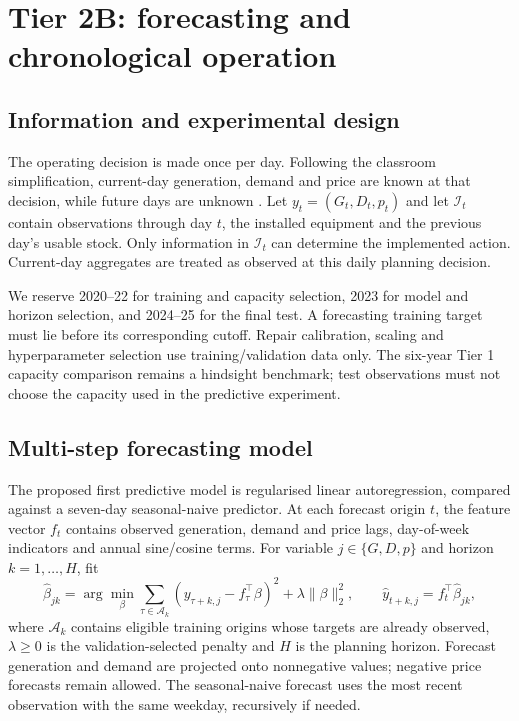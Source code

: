 \chapter{Tier 2B: forecasting and chronological operation}\label{chap:tier2}
\section{Information and experimental design}\label{sec:design2}
The operating decision is made once per day. Following the classroom
simplification, current-day generation, demand and price are known at that
decision, while future days are unknown \cite{teacher}. Let
\(y_t=(G_t,D_t,p_t)\) and let \(\mathcal I_t\) contain observations through
day \(t\), the installed equipment and the previous day's usable stock.
Only information in \(\mathcal I_t\) can determine the implemented action.
Current-day aggregates are treated as observed at this daily planning decision.

We reserve 2020--22 for training and capacity selection, 2023 for model and
horizon selection, and 2024--25 for the final test. A forecasting training
target must lie before its corresponding cutoff. Repair calibration, scaling and hyperparameter
selection use training/validation data only. The six-year Tier 1 capacity
comparison remains a hindsight benchmark; test observations must not
choose the capacity used in the predictive experiment.

\section{Multi-step forecasting model}\label{sec:forecast2}
The proposed first predictive model is regularised linear autoregression,
compared against a seven-day seasonal-naive predictor. At each forecast
origin \(t\), the feature vector \(f_t\) contains observed generation,
demand and price lags, day-of-week indicators and annual sine/cosine terms.
For variable \(j\in\{G,D,p\}\) and horizon \(k=1,\ldots,H\), fit
\begin{equation}
\widehat\beta_{jk}=\arg\min_{\beta}
\sum_{\tau\in\mathcal A_k}(y_{\tau+k,j}-f_\tau^{\top}\beta)^2
+\lambda\lVert\beta\rVert_2^2,
\qquad
\widehat y_{t+k,j}=f_t^{\top}\widehat\beta_{jk},
\end{equation}
where \(\mathcal A_k\) contains eligible training origins whose targets
are already observed, \(\lambda\ge0\) is the validation-selected penalty
and \(H\) is the planning horizon. Forecast generation and demand are
projected onto nonnegative values; negative price forecasts remain allowed.
The seasonal-naive forecast uses the most recent observation with the same
weekday, recursively if needed.

